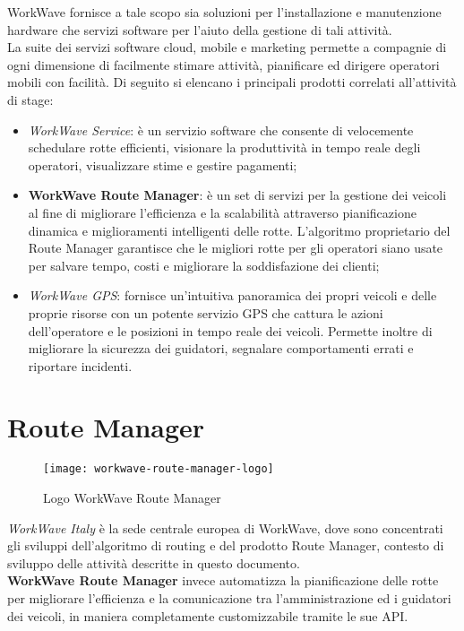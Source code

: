 WorkWave fornisce a tale scopo sia soluzioni per l'installazione e manutenzione hardware che servizi software per l'aiuto della gestione di tali attività. \\

La suite dei servizi software cloud, mobile e marketing permette a compagnie di ogni dimensione di facilmente stimare attività, pianificare ed dirigere operatori mobili con facilità. Di seguito si elencano i principali prodotti correlati all'attività di stage:

\begin{itemize}
  \item \textit{WorkWave Service}: è un servizio software che consente di velocemente schedulare rotte efficienti, visionare la produttività in tempo reale degli operatori, visualizzare stime e gestire pagamenti;
  \item \textbf{WorkWave Route Manager}: è un set di servizi per la gestione dei veicoli al fine di migliorare l'efficienza e la scalabilità attraverso pianificazione dinamica e miglioramenti intelligenti delle rotte. L'algoritmo proprietario del Route Manager garantisce che le migliori rotte per gli operatori siano usate per salvare tempo, costi e migliorare la soddisfazione dei clienti;
  \item \textit{WorkWave GPS}: fornisce un'intuitiva panoramica dei propri veicoli e delle proprie risorse con un potente servizio GPS che cattura le azioni dell'operatore e le posizioni in tempo reale dei veicoli. Permette inoltre di migliorare la sicurezza dei guidatori, segnalare comportamenti errati e riportare incidenti.
\end{itemize}

\section{Route Manager}

\begin{figure}[h] 
  \centering 
  \texttt{[image: workwave-route-manager-logo]} 
  \caption{Logo WorkWave Route Manager}
\end{figure}

\textit{WorkWave Italy} è la sede centrale europea di WorkWave, dove sono concentrati gli sviluppi dell'algoritmo di routing e del prodotto Route Manager, contesto di sviluppo delle attività descritte in questo documento. \\

\textbf{WorkWave Route Manager} invece automatizza la pianificazione delle rotte per migliorare l'efficienza e la comunicazione tra l'amministrazione ed i guidatori dei veicoli, in maniera completamente customizzabile tramite le sue API. \\


